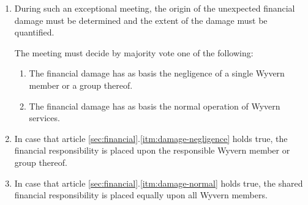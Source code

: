 \begin{enumerate}
\begin{item}
        \begin{enumerate}
            \item During such an exceptional meeting, the origin of the unexpected financial damage must be determined and the extent of the damage must be quantified.

            \begin{item}
                The meeting must decide by majority vote one of the following:

                \begin{enumerate}
                    \item \label{itm:damage-negligence} The financial damage has as basis the negligence of a single Wyvern member or a group thereof.
                    \item \label{itm:damage-normal} The financial damage has as basis the normal operation of Wyvern services.
                \end{enumerate}
            \end{item}

            \item In case that article \ref{sec:financial}.\ref{itm:damage-negligence} holds true, the financial responsibility is placed upon the responsible Wyvern member or group thereof.

            \item In case that article \ref{sec:financial}.\ref{itm:damage-normal} holds true, the shared financial responsibility is placed equally upon all Wyvern members.
        \end{enumerate}

    \end{item}
\end{enumerate}
